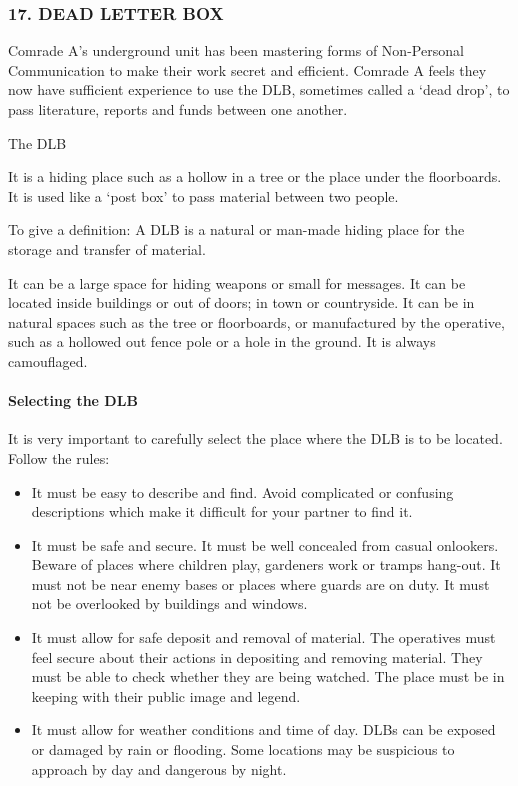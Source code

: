 \subsubsection{17. DEAD LETTER BOX}

Comrade A's underground unit has been mastering forms of Non-Personal
Communication to make their work secret and efficient. Comrade A feels
they now have sufficient experience to use the DLB, sometimes called a
`dead drop', to pass literature, reports and funds between one another.

{The DLB}

It is a hiding place such as a hollow in a tree or the place under the
floorboards. It is used like a `post box' to pass material between two
people.

To give a definition: A DLB is a natural or man-made hiding place for
the storage and transfer of material.

It can be a large space for hiding weapons or small for messages. It can
be located inside buildings or out of doors; in town or countryside. It
can be in natural spaces such as the tree or floorboards, or
manufactured by the operative, such as a hollowed out fence pole or a
hole in the ground. It is always camouflaged.

\paragraph{Selecting the DLB}

It is very important to carefully select the place where the DLB is to
be located. Follow the rules:

\begin{itemize}
\tightlist
\item
  It must be easy to describe and find. Avoid complicated or confusing
  descriptions which make it difficult for your partner to find it.
\item
  It must be safe and secure. It must be well concealed from casual
  onlookers. Beware of places where children play, gardeners work or
  tramps hang-out. It must not be near enemy bases or places where
  guards are on duty. It must not be overlooked by buildings and
  windows.
\item
  It must allow for safe deposit and removal of material. The operatives
  must feel secure about their actions in depositing and removing
  material. They must be able to check whether they are being watched.
  The place must be in keeping with their public image and legend.
\item
  It must allow for weather conditions and time of day. DLBs can be
  exposed or damaged by rain or flooding. Some locations may be
  suspicious to approach by day and dangerous by night.
\end{itemize}

